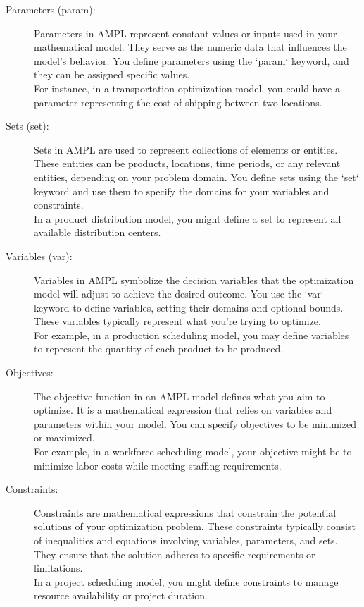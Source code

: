 \begin{description}
    \item[Parameters (param):] 
    Parameters in AMPL represent constant values or inputs used in your mathematical model. They serve as the numeric data that influences the model's behavior. You define parameters using the `param` keyword, and they can be assigned specific values. \\
    For instance, in a transportation optimization model, you could have a parameter representing the cost of shipping between two locations.\\
    \item[Sets (set):]
    Sets in AMPL are used to represent collections of elements or entities. These entities can be products, locations, time periods, or any relevant entities, depending on your problem domain. You define sets using the `set` keyword and use them to specify the domains for your variables and constraints. \\
    In a product distribution model, you might define a set to represent all available distribution centers.\\
    
\item[Variables (var):]
    Variables in AMPL symbolize the decision variables that the optimization model will adjust to achieve the desired outcome. You use the `var` keyword to define variables, setting their domains and optional bounds. These variables typically represent what you're trying to optimize. \\
    For example, in a production scheduling model, you may define variables to represent the quantity of each product to be produced.\\
    
\item[Objectives:]
    The objective function in an AMPL model defines what you aim to optimize. It is a mathematical expression that relies on variables and parameters within your model. You can specify objectives to be minimized or maximized. \\
    For example, in a workforce scheduling model, your objective might be to minimize labor costs while meeting staffing requirements.\\

\item[Constraints:]
    Constraints are mathematical expressions that constrain the potential solutions of your optimization problem. These constraints typically consist of inequalities and equations involving variables, parameters, and sets. They ensure that the solution adheres to specific requirements or limitations. \\
    In a project scheduling model, you might define constraints to manage resource availability or project duration.
\end{description}

